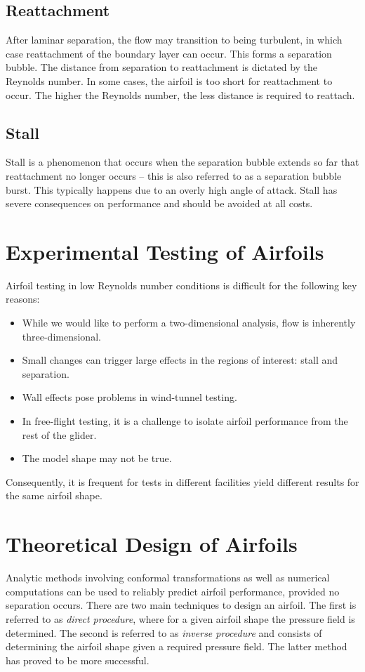 \subsection{Reattachment}
After laminar separation, the flow may transition to being turbulent, in which case reattachment of the
boundary layer can occur. This forms a separation bubble. The distance from separation to reattachment
is dictated by the Reynolds number. In some cases, the airfoil is too short for reattachment to occur. The higher
the Reynolds number, the less distance is required to reattach.

\subsection{Stall}
Stall is a phenomenon that occurs when the separation bubble extends so far that reattachment no longer occurs -- this
is also referred to as a separation bubble burst. This typically happens due to an overly high angle of attack. Stall has
severe consequences on performance and should be avoided at all costs.

\section{Experimental Testing of Airfoils}
Airfoil testing in low Reynolds number conditions is difficult for the following key reasons:
\begin{itemize}[noitemsep, nolistsep]
    \item While we would like to perform a two-dimensional analysis, flow is inherently three-dimensional.
    \item Small changes can trigger large effects in the regions of interest: stall and separation.
    \item Wall effects pose problems in wind-tunnel testing.
    \item In free-flight testing, it is a challenge to isolate airfoil performance from the rest of the glider.
    \item The model shape may not be true.
\end{itemize}
Consequently, it is frequent for tests in different facilities yield different results for the same airfoil shape.

\section{Theoretical Design of Airfoils}
Analytic methods involving conformal transformations as well as numerical computations can be used
to reliably predict airfoil performance, provided no separation occurs. There are two main techniques to
design an airfoil. The first is referred to as \emph{direct procedure}, where for a given airfoil shape
the pressure field is determined. The second is referred to as \emph{inverse procedure} and consists of
determining the airfoil shape given a required pressure field. The latter method has proved to be
more successful.

